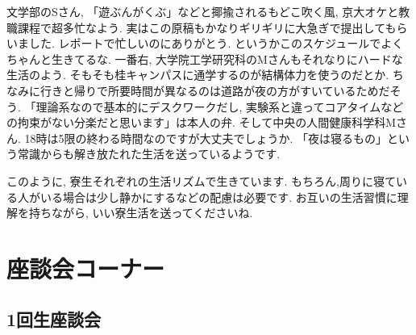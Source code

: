 \documentclass[10pt,b5jsbook,dvips,dvipdfmx,openany]{jsbook}
\theoremstyle{definition}
\begin{document}
			文学部のSさん, 「遊ぶんがくぶ」などと揶揄されるもどこ吹く風, 京大オケと教職課程で超多忙なよう. 実はこの原稿もかなりギリギリに大急ぎで提出してもらいました. レポートで忙しいのにありがとう. というかこのスケジュールでよくちゃんと生きてるな. 一番右, 大学院工学研究科のMさんもそれなりにハードな生活のよう. そもそも桂キャンパスに通学するのが結構体力を使うのだとか. ちなみに行きと帰りで所要時間が異なるのは道路が夜の方がすいているためだそう. 「理論系なので基本的にデスクワークだし, 実験系と違ってコアタイムなどの拘束がない分楽だと思います」は本人の弁. そして中央の人間健康科学科Mさん. 18時は5限の終わる時間なのですが大丈夫でしょうか. 「夜は寝るもの」という常識からも解き放たれた生活を送っているようです. 
			
			このように, 寮生それぞれの生活リズムで生きています. もちろん,周りに寝ている人がいる場合は少し静かにするなどの配慮は必要です. お互いの生活習慣に理解を持ちながら, いい寮生活を送ってくださいね. 
			
\newpage
	\section{座談会コーナー}

	\setcounter{footnote}{0}

		\subsection{1回生座談会}
\end{document}
